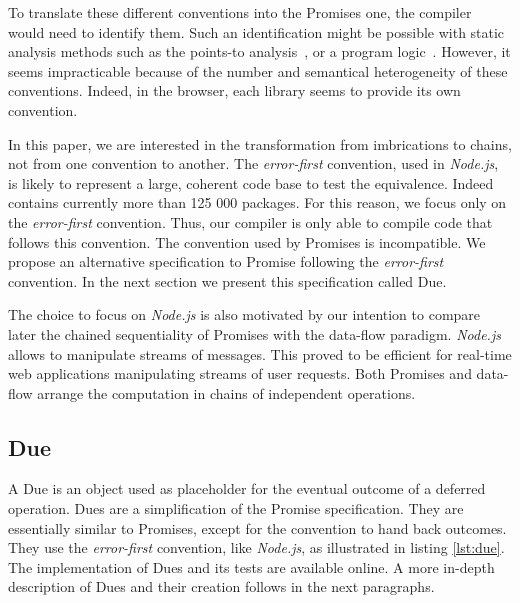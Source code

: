To translate these different conventions into the Promises one, the compiler would need to identify them.
Such an identification might be possible with static analysis methods such as the points-to analysis~\cite{Wei2014}, or a program logic~\cite{Gardner2013,Bodin2014}.
However, it seems impracticable because of the number and semantical heterogeneity of these conventions.
Indeed, in the browser, each library seems to provide its own convention.

In this paper, we are interested in the transformation from imbrications to chains, not from one convention to another.
The \textit{error-first} convention, used in \textit{Node.js}, is likely to represent a large, coherent code base to test the equivalence.
Indeed contains currently more than 125 000 packages.
For this reason, we focus only on the \textit{error-first} convention.
Thus, our compiler is only able to compile code that follows this convention.
The convention used by Promises is incompatible.
We propose an alternative specification to Promise following the \textit{error-first} convention.
In the next section we present this specification called Due.

The choice to focus on \textit{Node.js} is also motivated by our intention to compare later the chained sequentiality of Promises with the data-flow paradigm.
\textit{Node.js} allows to manipulate streams of messages.
This proved to be efficient for real-time web applications manipulating streams of user requests.
Both Promises and data-flow arrange the computation in chains of independent operations.

\subsection{Due} \label{section:definitions:due}

A Due is an object used as placeholder for the eventual outcome of a deferred operation.
Dues are a simplification of the Promise specification.
They are essentially similar to Promises, except for the convention to hand back outcomes.
They use the \textit{error-first} convention, like \textit{Node.js}, as illustrated in listing \ref{lst:due}.
The implementation of Dues and its tests are available online.
A more in-depth description of Dues and their creation follows in the next paragraphs.

